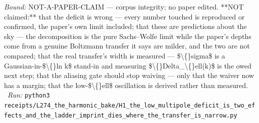 \begin{description}
 \emph{Bound:} NOT-A-PAPER-CLAIM --- corpus integrity; no paper edited. **NOT claimed:** that the deficit is wrong --- every number touched is reproduced or confirmed, the paper's own limit included; that these are predictions about the sky --- the decomposition is the pure Sachs--Wolfe limit while the paper's depths come from a genuine Boltzmann transfer it says are milder, and the two are not compared; that the real transfer's width is measured --- \$\textbackslash\{\}sigma\$ is a Gaussian-in-\$\textbackslash\{\}ln k\$ stand-in and measuring \$\textbackslash\{\}Delta\_\textbackslash\{\}ell(k)\$ is the owed next step; that the aliasing gate should stop waiving --- only that the waiver now has a margin; that the low-\$\textbackslash\{\}ell\$ oscillation is derived rather than measured.
\ \emph{Run:} \texttt{python3 receipts/L274\_the\_harmonic\_bake/H1\_the\_low\_multipole\_deficit\_is\_two\_effects\_and\_the\_ladder\_imprint\_dies\_where\_the\_transfer\_is\_narrow.py}
\end{description}\endgroup

